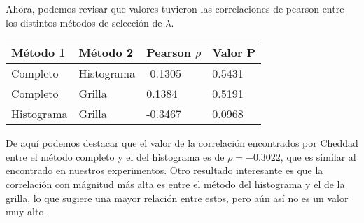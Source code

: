     Ahora, podemos revisar que valores tuvieron las correlaciones de pearson entre los distintos m\'etodos de selecci\'on de $\lambda$.


    \begin{table}[H]
        \centering
        \begin{tabular}{|l|l|l|l|}
            \hline
            M\'etodo 1 & M\'etodo 2 & Pearson $\rho$ & Valor P \\ \hline
            Completo                  & Histograma                & -0.1305   & 0.5431  \\ 
            Completo                  & Grilla                    & 0.1384    & 0.5191  \\ 
            Histograma                & Grilla                    & -0.3467   & 0.0968  \\ \hline
        \end{tabular}
    \end{table}

    De aqu\'i podemos destacar que el valor de la correlaci\'on encontrados por Cheddad \cite{boxcoximg} entre el m\'etodo completo y el del histograma es de $\rho=-0.3022$, que es similar al encontrado en nuestros experimentos. Otro resultado interesante es que la correlaci\'on con m\'agnitud m\'as alta es entre el m\'etodo del histograma y el de la grilla, lo que sugiere una mayor relaci\'on entre estos, pero a\'un as\'i  no es un valor muy alto.

